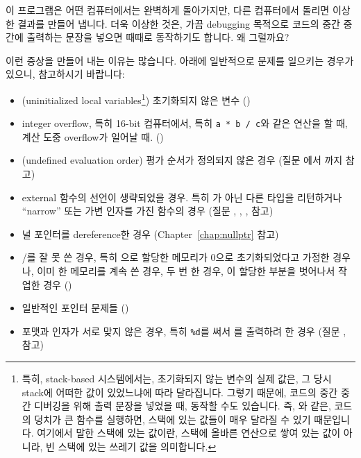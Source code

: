\begin{faq}
	이 프로그램은 어떤 컴퓨터에서는 완벽하게 돌아가지만, 다른
	컴퓨터에서 돌리면 이상한 결과를 만들어 냅니다.  더욱 이상한 것은,
	가끔 debugging 목적으로 코드의 중간 중간에 출력하는 문장을 넣으면
        때때로 동작하기도 합니다. 왜 그럴까요?

\A
	이런 증상을 만들어 내는 이유는 많습니다.  아래에 일반적으로
	문제를 일으키는 경우가 있으니, 참고하시기 바랍니다:

	\begin{itemize}
	\item (uninitialized local variables\footnote{특히, stack-based
          시스템에서는, 초기화되지 않는 변수의 실제 값은, 그 당시 stack에 어떠한 값이
          있었느냐에 따라 달라집니다. 그렇기 때문에, 코드의 중간 중간 디버깅을 위해
          출력 문장을 넣었을 때, 동작할 수도 있습니다. 즉, 와 같은,
          코드의 덩치가 큰 함수를 실행하면, 스택에 있는 값들이 매우 달라질 수 있기
          때문입니다. \note 여기에서 말한 스택에 있는 값이란, 스택에 올바른 연산으로
        쌓여 있는 값이 아니라, 빈 스택에 있는 쓰레기 값을 의미합니다.})
          초기화되지 않은 변수 ()
	\item integer overflow, 특히 16-bit 컴퓨터에서, 특히
		\verb+a * b / c+와 같은 연산을 할 때, 계산 도중 
                overflow가 일어날 때. ()
	\item (undefined evaluation order) 평가 순서가 정의되지 않은 경우
          (질문 에서 까지 참고)
	\item external 함수의 선언이 생략되었을 경우.  특히 가 아닌
		다른 타입을 리턴하거나 ``narrow'' 또는 가변 인자를 가진 함수의 경우
		(질문 , , ,  참고)
	\item 널 포인터를 dereference한 경우 (Chapter~\ref{chap:nullptr} 참고)

	\item {}/를 잘 못 쓴 경우, 특히 으로
		할당한 메모리가 0으로 초기화되었다고 가정한 경우나,
		이미 한 메모리를 계속 쓴 경우, 두 번 한
		경우, 이 할당한 부분을 벗어나서 작업한 경우
		()

	\item 일반적인 포인터 문제들 ()

	\item {} 포맷과 인자가 서로 맞지 않은 경우, 특히
		\verb+%d+를 써서 를 출력하려 한 경우
		(질문 ,  참고)


\end{itemize}
\end{faq}
